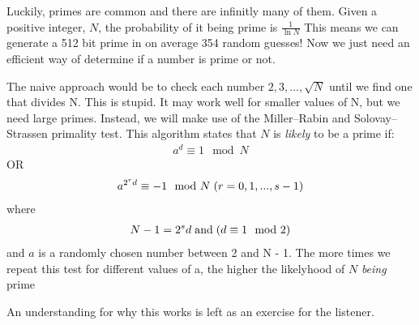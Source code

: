 \documentclass[aspectratio=169]{beamer}
\begin{document}
\begin{frame}
    \begin{center}
        Luckily, primes are common and there are infinitly many of them. Given a positive integer, $N$, the probability of it being prime is $\frac{1}{\ln N}$
        \newline
        \newline
        This means we can generate a 512 bit prime in on average 354 random guesses! 
        \newline
        \newline
        Now we just need an efficient way of determine if a number is prime or not.
    \end{center}
\end{frame}

\begin{frame}
    \begin{center}
        The naive approach would be to check each number $2,3,...,\sqrt{N}$ until we find one that divides N. This is stupid. It may work well for smaller values of N, but we need large primes. Instead, we will make use of the Miller–Rabin and Solovay–Strassen primality test. This algorithm states that $N$ is \textit{likely} to be a prime if:
        \begin{align*}
            a^{d} \equiv 1 \mod N
        \end{align*}
        OR
        \begin{align*}
            a^{2^{r}d} \equiv -1 \mod N \hspace{1mm} (r=0,1, ... , s-1)
        \end{align*}
        where
        \begin{align*}
            N - 1 = 2^{s}d \hspace{1mm}\text{and}\hspace{1mm} (d \equiv 1 \mod 2)
        \end{align*}
        and $a$ is a randomly chosen number between 2 and N - 1. The more times we repeat this test for different values of a, the higher the likelyhood of $N$ \textit{being} prime 
    \end{center}
\end{frame}

\begin{frame}
    \begin{center}
        An understanding for why this works is left as an exercise for the listener.
    \end{center}
\end{frame}
\end{document}
